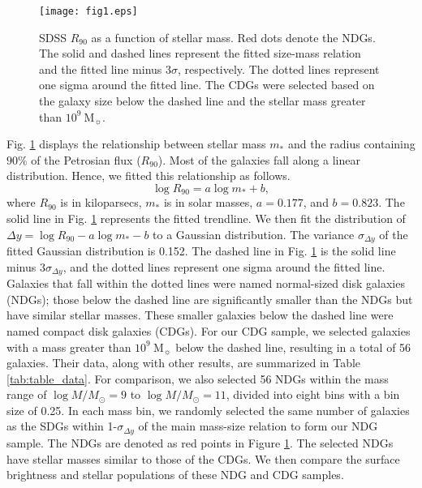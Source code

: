 \documentclass[fleqn,usenatbib]{mnras}
\begin{document}
\begin{figure}
        \texttt{[image: fig1.eps]}
    \caption{SDSS $R_{90}$ as a function of stellar mass. Red dots denote the NDGs. The solid and dashed lines represent the fitted size-mass relation and the fitted line minus $3\sigma$, respectively. The dotted lines represent one sigma around the fitted line. The CDGs were selected based on the galaxy size below the dashed line and the stellar mass greater than $10^{9}~\mathrm{M_{\sun}}$.}
    \label{fig1}
\end{figure}
Fig. \ref{fig1} displays the relationship between stellar mass $m_*$ and the radius containing $90\%$ of the Petrosian flux ($R_{90}$).
Most of the galaxies fall along a linear distribution.
Hence, we fitted this relationship as follows.
\begin{equation}
\log R_{90} = a\log m_* + b,
\end{equation}
where $R_{90}$ is in kiloparsecs, $m_*$ is in solar masses, $a=0.177$, and $b=0.823$.
The solid line in Fig. \ref{fig1} represents the fitted trendline.
We then fit the distribution of $\Delta y = \log R_{90} - a\log m_* - b$ to a Gaussian distribution.
The variance $\sigma_{\Delta y}$ of the fitted Gaussian distribution is 0.152. 
The dashed line in Fig. \ref{fig1} is the solid line minus $3\sigma_{\Delta y}$, and the dotted lines represent one sigma around the fitted line.
Galaxies that fall within the dotted lines were named normal-sized disk galaxies (NDGs); those below the dashed line are significantly smaller than the NDGs but have similar stellar masses.
These smaller galaxies below the dashed line were named compact disk galaxies (CDGs).
For our CDG sample, we selected galaxies with a mass greater than $10^{9}~\mathrm{M_{\sun}}$ below the dashed line, resulting in a total of 56 galaxies. 
Their data, along with other results, are summarized in Table \ref{tab:table_data}.
For comparison, we also selected 56 NDGs within the mass range of $\log M / M_{\odot} = 9$ to $\log M / M_{\odot}=11$, divided into eight bins with a bin size of 0.25.
In each mass bin, we randomly selected the same number of galaxies as the SDGs within 1-$\sigma_{\Delta y}$ of the main mass-size relation to form our NDG sample.
The NDGs are denoted as red points in Figure \ref{fig1}.
The selected NDGs have stellar masses similar to those of the CDGs.
We then compare the surface brightness and stellar populations of these NDG and CDG samples.
\end{document}
